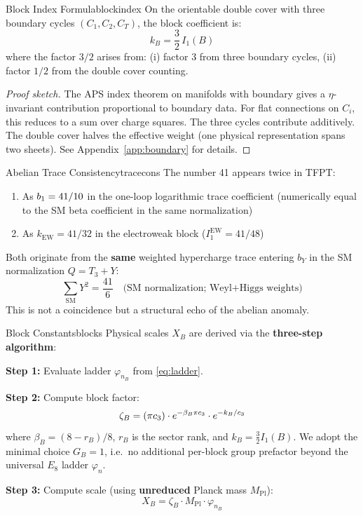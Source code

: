 \begin{theorem}{Block Index Formula}{blockindex}
On the orientable double cover with three boundary cycles $(C_1, C_2, C_T)$, 
the block coefficient is:
\begin{equation}
    k_B = \frac{3}{2}\, I_1(B)
\end{equation}
where the factor $3/2$ arises from: (i) factor 3 from three boundary cycles, 
(ii) factor $1/2$ from the double cover counting.
\end{theorem}

\begin{proof}[Proof sketch]
The APS index theorem on manifolds with boundary gives a $\eta$-invariant 
contribution proportional to boundary data. For flat connections on $C_i$, 
this reduces to a sum over charge squares. The three cycles contribute 
additively. The double cover halves the effective weight (one physical 
representation spans two sheets). See Appendix~\ref{app:boundary} for details.
\end{proof}

\begin{corollary}{Abelian Trace Consistency}{tracecons}
The number 41 appears twice in TFPT:
\begin{enumerate}[leftmargin=1.5em, topsep=2pt, itemsep=1pt]
    \item As $b_1 = 41/10$ in the one-loop logarithmic trace coefficient (numerically equal to the SM beta coefficient in the same normalization)
    \item As $k_{\text{EW}} = 41/32$ in the electroweak block ($I_1^{\text{EW}} = 41/48$)
\end{enumerate}
Both originate from the \textbf{same} weighted hypercharge trace entering $b_Y$ in the
SM normalization $Q=T_3+Y$:
\begin{equation}
    \sum_{\text{SM}} Y^2 = \frac{41}{6} \quad \text{(SM normalization; Weyl+Higgs weights)}
\end{equation}
This is not a coincidence but a structural echo of the abelian anomaly.
\end{corollary}

\begin{definition}{Block Constants}{blocks}
Physical scales $X_B$ are derived via the \textbf{three-step algorithm}:

\textbf{Step 1:} Evaluate ladder $\varphi_{n_B}$ from \eqref{eq:ladder}.

\textbf{Step 2:} Compute block factor:
\begin{equation}
    \zeta_B = (\pi c_3) \cdot e^{-\beta_B\pi c_3} 
        \cdot e^{-k_B/c_3}
\end{equation}
where $\beta_B = (8 - r_B)/8$, $r_B$ is the sector rank, and $k_B = \frac{3}{2}I_1(B)$.
We adopt the minimal choice $G_B=1$, i.e.\ no additional per-block group prefactor beyond the universal $E_8$ ladder $\varphi_n$.

\textbf{Step 3:} Compute scale (using \textbf{unreduced} Planck mass $M_{\mathrm{Pl}}$):
\begin{equation}
    X_B = \zeta_B \cdot M_{\mathrm{Pl}} \cdot \varphi_{n_B}
\end{equation}
\end{definition}

